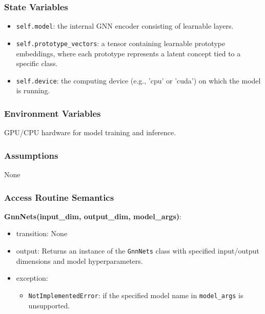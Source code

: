 \documentclass[12pt, titlepage]{article}
\begin{document}
\subsubsection{State Variables}
\begin{itemize}
  \item \texttt{self.model}: the internal GNN encoder consisting of learnable layers.
  \item \texttt{self.prototype\_vectors}: a tensor containing learnable prototype embeddings, where each prototype represents a latent concept tied to a specific class.
  \item \texttt{self.device}: the computing device (e.g., 'cpu' or 'cuda') on which the model is running.
\end{itemize}

\subsubsection{Environment Variables}
GPU/CPU hardware for model training and inference.

\subsubsection{Assumptions}
None

\subsubsection{Access Routine Semantics}

\noindent \textbf{GnnNets(input\_dim, output\_dim, model\_args)}:
\begin{itemize}
  \item transition: None
  \item output: Returns an instance of the \texttt{GnnNets} class with specified input/output dimensions and model hyperparameters.
  \item exception:     
    \begin{itemize}
      \item \texttt{NotImplementedError}: if the specified model name in \texttt{model\_args} is unsupported.
    \end{itemize}
\end{itemize}
\end{document}
